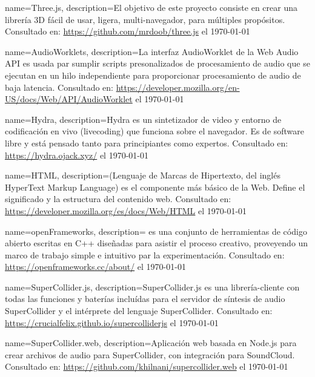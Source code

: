                 {
                   name=Three.js,
    description={El objetivo de este proyecto consiste en crear una librería 3D fácil de usar, ligera, multi-navegador, para múltiples propósitos. Consultado en: \url{https://github.com/mrdoob/three.js} el \today}}


                 {
                   name=AudioWorklets,
    description={La interfaz AudioWorklet de la Web Audio API es usada par sumplir scripts presonalizados de procesamiento de audio que se ejecutan en un hilo independiente para proporcionar procesamiento de audio de baja latencia. Consultado en: \url{https://developer.mozilla.org/en-US/docs/Web/API/AudioWorklet} el \today}}

                 {
                   name=Hydra,
    description={Hydra es un sintetizador de video y entorno de codificación en vivo (livecoding) que funciona sobre el navegador. Es de software libre y está pensado tanto para principiantes como expertos. Consultado en: \url{https://hydra.ojack.xyz/} el \today}}

                 {
                   name=HTML,
    description={(Lenguaje de Marcas de Hipertexto, del inglés HyperText Markup Language) es el componente más básico de la Web. Define el significado y la estructura del contenido web. Consultado en: \url{https://developer.mozilla.org/es/docs/Web/HTML} el \today}}

                 {
                   name=openFrameworks,
    description={ es una conjunto de herramientas de código abierto escritas en C++ diseñadas para asistir el proceso creativo, proveyendo un marco de trabajo simple e intuitivo par la experimentación. Consultado en: \url{https://openframeworks.cc/about/} el \today}}

                 {
                   name=SuperCollider.js,
    description={SuperCollider.js es una librería-cliente con todas las funciones y baterías incluídas para el servidor de síntesis de audio SuperCollider y el intérprete del lenguaje SuperCollider. Consultado en: \url{https://crucialfelix.github.io/supercolliderjs} el \today}}

                 {
                   name=SuperCollider.web,
    description={Aplicación web basada en Node.js para crear archivos de audio para SuperCollider, con integración para SoundCloud. Consultado en: \url{https://github.com/khilnani/supercollider.web} el \today}}

